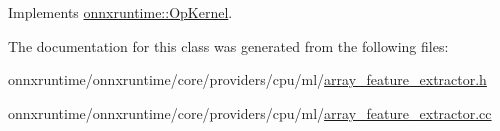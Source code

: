 Implements \mbox{\hyperlink{classonnxruntime_1_1OpKernel_a9eca8656a78b1b3ab9d3351a12798650}{onnxruntime\+::\+Op\+Kernel}}.



The documentation for this class was generated from the following files\+:\begin{DoxyCompactItemize}
\item 
onnxruntime/onnxruntime/core/providers/cpu/ml/\mbox{\hyperlink{array__feature__extractor_8h}{array\+\_\+feature\+\_\+extractor.\+h}}\item 
onnxruntime/onnxruntime/core/providers/cpu/ml/\mbox{\hyperlink{array__feature__extractor_8cc}{array\+\_\+feature\+\_\+extractor.\+cc}}\end{DoxyCompactItemize}
